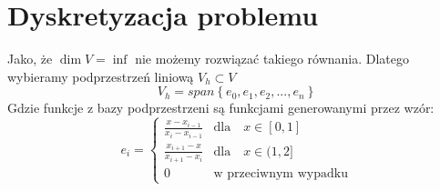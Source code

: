 \documentclass[a4paper]{article}
\begin{document}
  \section{Dyskretyzacja problemu}
  Jako, że $\dim V = \inf$ nie możemy rozwiązać takiego równania. Dlatego wybieramy podprzestrzeń liniową
  $V_h \subset V$
  \[V_h = span \left\{e_0, e_1, e_2, ... , e_n\right\}\]
  Gdzie funkcje z bazy podprzestrzeni są funkcjami generowanymi przez wzór:
  \[
    e_i = 
    \begin{cases}
        \frac{x - x_{i-1}}{x_i - x_{i-1}}  & \text{dla} \quad x\in [0,1]\\
        \frac{x_{i+1} - x}{x_{i+1} - x_i}  & \text{dla} \quad x\in (1,2] \\
        0 & \text{w przeciwnym wypadku}
    \end{cases}  
  \]
  \pagebreak
\end{document}
